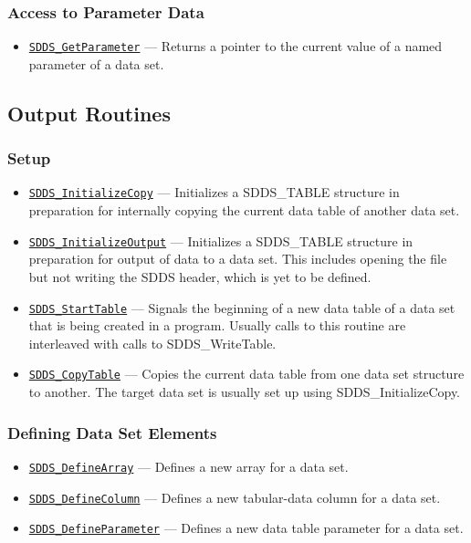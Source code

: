 \documentclass[11pt]{article}
\newcommand{\progref}[1]{\hyperref[SDDS_#1]{\tt SDDS\_#1}}
\begin{document}
\subsubsection{Access to Parameter Data}

\begin{itemize}
\item \progref{GetParameter} --- Returns a pointer to the current value of a named parameter of a data set. 
\end{itemize}

\subsection{Output Routines}
\subsubsection{Setup}

\begin{itemize}
\item \progref{InitializeCopy} --- Initializes a SDDS\_TABLE structure in preparation for internally copying the current data table of another data set.
\item \progref{InitializeOutput} --- Initializes a SDDS\_TABLE structure in preparation for output of data to a data set. This includes opening the file but not writing the SDDS header, which is yet to be defined.
\item \progref{StartTable} --- Signals the beginning of a new data table of a data set that is being created in a program. Usually calls to this routine are interleaved with calls to SDDS\_WriteTable.
\item \progref{CopyTable} --- Copies the current data table from one data set structure to another. The target data set is usually set up using SDDS\_InitializeCopy. 
\end{itemize}

\subsubsection{Defining Data Set Elements}

\begin{itemize}
\item \progref{DefineArray} --- Defines a new array for a data set.
\item \progref{DefineColumn} --- Defines a new tabular-data column for a data set.
\item \progref{DefineParameter} --- Defines a new data table parameter for a data set. 
\end{itemize}
\end{document}

